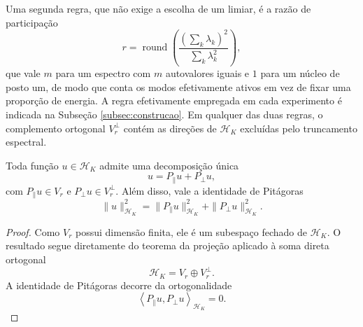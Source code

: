 Uma segunda regra, que não exige a escolha de um limiar, é a razão de participação
\begin{equation}\label{eq:r_participation}
    r
    =
    \operatorname{round}
    \left(
        \frac{
            \left(\sum_k \lambda_k\right)^2
        }{
            \sum_k \lambda_k^2
        }
    \right),
\end{equation}
que vale $m$ para um espectro com $m$ autovalores iguais e $1$ para um núcleo de posto um, de modo que conta os modos efetivamente ativos em vez de fixar uma proporção de energia. A regra efetivamente empregada em cada experimento é indicada na Subseção \ref{subsec:construcao}. Em qualquer das duas regras, o complemento ortogonal $V_r^\perp$ contém as direções de $\mathcal{H}_K$ excluídas pelo truncamento espectral.
 
\begin{proposition}\label{prop:ortho_decomp}
Toda função $u \in \mathcal{H}_K$ admite uma decomposição única
\begin{equation}\label{eq:ortho_decomp}
    u
    =
    P_\parallel u
    +
    P_\perp u,
\end{equation}
com $P_\parallel u \in V_r$ e $P_\perp u \in V_r^\perp$. Além disso, vale a identidade de Pitágoras
\begin{equation}\label{eq:pythagoras}
    \|u\|_{\mathcal{H}_K}^2
    =
    \|P_\parallel u\|_{\mathcal{H}_K}^2
    +
    \|P_\perp u\|_{\mathcal{H}_K}^2.
\end{equation}
\end{proposition}
 
\begin{proof}
Como $V_r$ possui dimensão finita, ele é um subespaço fechado de $\mathcal{H}_K$. O resultado segue diretamente do teorema da projeção aplicado à soma direta ortogonal
\begin{equation*}
    \mathcal{H}_K
    =
    V_r
    \oplus
    V_r^\perp.
\end{equation*}
A identidade de Pitágoras decorre da ortogonalidade
\begin{equation*}
    \left\langle
        P_\parallel u,
        P_\perp u
    \right\rangle_{\mathcal{H}_K}
    =
    0.
\end{equation*}
\end{proof}
 

